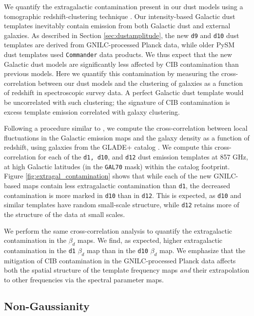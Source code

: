 \documentclass[twocolumn]{aastex631}
\begin{document}
We quantify the extragalactic contamination present in our dust models using a tomographic redshift-clustering technique \citep{Schmidt:2015, Chiang:2019}. Our intensity-based Galactic dust templates inevitably contain emission from both Galactic dust and external galaxies. As described in Section \ref{sec:dustamplitude}, the new \texttt{d9} and \texttt{d10} dust templates are derived from GNILC-processed Planck data, while older PySM dust templates used \texttt{Commander} data products. We thus expect that the new Galactic dust models are significantly less affected by CIB contamination than previous models. Here we quantify this contamination by measuring the cross-correlation between our dust models and the clustering of galaxies as a function of redshift in spectroscopic survey data. A perfect Galactic dust template would be uncorrelated with such clustering; the signature of CIB contamination is excess template emission correlated with galaxy clustering. 

Following a procedure similar to \citet{Chiang:2019}, we compute the cross-correlation between local fluctuations in the Galactic emission maps and the galaxy density as a function of redshift, using galaxies from the GLADE+ catalog \citep{Dalya:2022}. We compute this cross-correlation for each of the \texttt{d1, d10}, and \texttt{d12} dust emission templates at 857 GHz, at high Galactic latitudes (in the \texttt{GAL70} mask) within the catalog footprint. Figure \ref{fig:extragal_contamination} shows that while each of the new GNILC-based maps contain less extragalactic contamination than \texttt{d1}, the decreased contamination is more marked in \texttt{d10} than in \texttt{d12}. This is expected, as \texttt{d10} and similar templates have random small-scale structure, while \texttt{d12} retains more of the structure of the data at small scales. 

We perform the same cross-correlation analysis to quantify the extragalactic contamination in the $\beta_d$ maps. We find, as expected, higher extragalactic contamination in the \texttt{d1} $\beta_d$ map than in the \texttt{d10} $\beta_d$ map. We emphasize that the mitigation of CIB contamination in the GNILC-processed Planck data affects both the spatial structure of the template frequency maps \textit{and} their extrapolation to other frequencies via the spectral parameter maps. 

\subsection{Non-Gaussianity} \label{sec:nongaussianity}
\end{document}
